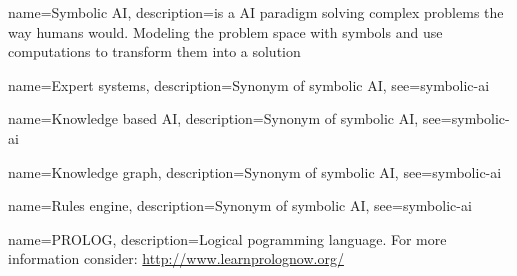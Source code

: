 



{
  name={Symbolic AI},
  description={is a AI paradigm solving complex problems the way humans would. Modeling the problem space with symbols and use computations to transform them into a solution}
}

{
  name={Expert systems},
  description={Synonym of symbolic AI},
  see={symbolic-ai}
}

{
  name={Knowledge based AI},
  description={Synonym of symbolic AI},
  see={symbolic-ai}
}

{
  name={Knowledge graph},
  description={Synonym of symbolic AI},
  see={symbolic-ai}
}

{
  name={Rules engine},
  description={Synonym of symbolic AI},
  see={symbolic-ai}
}

{
  name={PROLOG},
  description={Logical pogramming language. For more information consider: \url{http://www.learnprolognow.org/}}
}